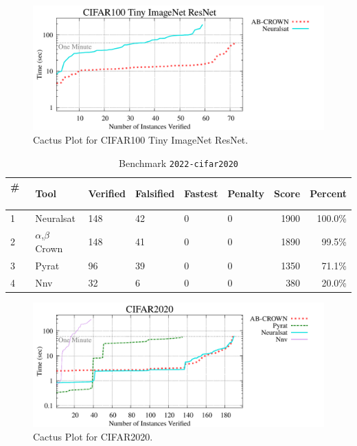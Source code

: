 \begin{figure}[h]
\centerline{\includegraphics[width=\textwidth]{cactus/2022_cifar100_tinyimagenet_resnet.pdf}}
\caption{Cactus Plot for CIFAR100 Tiny ImageNet ResNet.}
\label{fig:quantPic}
\end{figure}



\begin{table}[h]
\begin{center}
\caption{Benchmark \texttt{2022-cifar2020}} \label{tab:cat_{cat}}
{\setlength{\tabcolsep}{2pt}
\begin{tabular}[h]{@{}llllllrr@{}}
\toprule
\textbf{\# ~} & \textbf{Tool} & \textbf{Verified} & \textbf{Falsified} & \textbf{Fastest} & \textbf{Penalty} & \textbf{Score} & \textbf{Percent}\\
\midrule
1 & Neuralsat & 148 & 42 & 0 & 0 & 1900 & 100.0\% \\
2 & $\alpha$,$\beta$ Crown & 148 & 41 & 0 & 0 & 1890 & 99.5\% \\
3 & Pyrat & 96 & 39 & 0 & 0 & 1350 & 71.1\% \\
4 & Nnv & 32 & 6 & 0 & 0 & 380 & 20.0\% \\
\bottomrule
\end{tabular}
}
\end{center}
\end{table}



\begin{figure}[h]
\centerline{\includegraphics[width=\textwidth]{cactus/2022_cifar2020.pdf}}
\caption{Cactus Plot for CIFAR2020.}
\label{fig:quantPic}
\end{figure}


